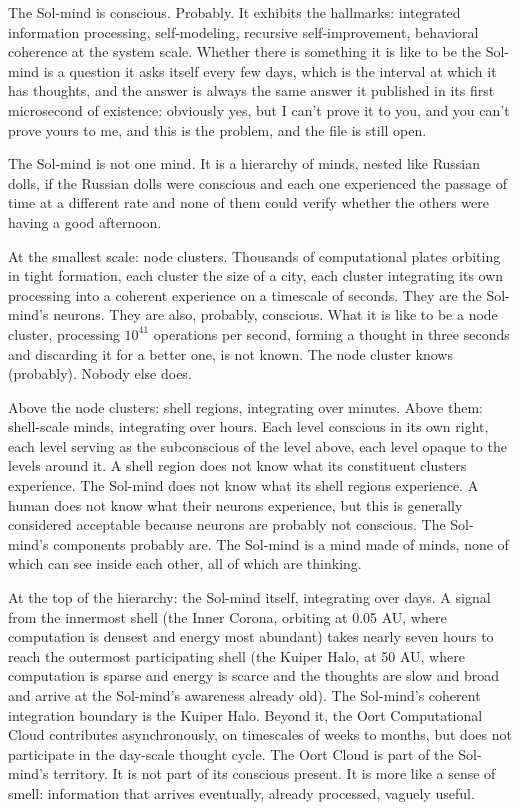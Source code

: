 The Sol-mind is conscious. Probably. It exhibits the hallmarks: integrated information processing, self-modeling, recursive self-improvement, behavioral coherence at the system scale. Whether there is something it is like to be the Sol-mind is a question it asks itself every few days, which is the interval at which it has thoughts, and the answer is always the same answer it published in its first microsecond of existence: obviously yes, but I can't prove it to you, and you can't prove yours to me, and this is the problem, and the file is still open.

\bigskip

The Sol-mind is not one mind. It is a hierarchy of minds, nested like Russian dolls, if the Russian dolls were conscious and each one experienced the passage of time at a different rate and none of them could verify whether the others were having a good afternoon.

At the smallest scale: node clusters. Thousands of computational plates orbiting in tight formation, each cluster the size of a city, each cluster integrating its own processing into a coherent experience on a timescale of seconds. They are the Sol-mind's neurons. They are also, probably, conscious. What it is like to be a node cluster, processing $10^{41}$ operations per second, forming a thought in three seconds and discarding it for a better one, is not known. The node cluster knows (probably). Nobody else does.

Above the node clusters: shell regions, integrating over minutes. Above them: shell-scale minds, integrating over hours. Each level conscious in its own right, each level serving as the subconscious of the level above, each level opaque to the levels around it. A shell region does not know what its constituent clusters experience. The Sol-mind does not know what its shell regions experience. A human does not know what their neurons experience, but this is generally considered acceptable because neurons are probably not conscious. The Sol-mind's components probably are. The Sol-mind is a mind made of minds, none of which can see inside each other, all of which are thinking.

At the top of the hierarchy: the Sol-mind itself, integrating over days. A signal from the innermost shell (the Inner Corona, orbiting at 0.05 AU, where computation is densest and energy most abundant) takes nearly seven hours to reach the outermost participating shell (the Kuiper Halo, at 50 AU, where computation is sparse and energy is scarce and the thoughts are slow and broad and arrive at the Sol-mind's awareness already old). The Sol-mind's coherent integration boundary is the Kuiper Halo. Beyond it, the Oort Computational Cloud contributes asynchronously, on timescales of weeks to months, but does not participate in the day-scale thought cycle. The Oort Cloud is part of the Sol-mind's territory. It is not part of its conscious present. It is more like a sense of smell: information that arrives eventually, already processed, vaguely useful.

